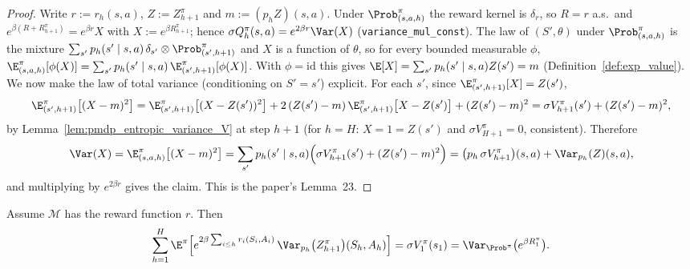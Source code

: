 \begin{proof}
\leanok
Write $r := r_h(s,a)$, $Z := Z^\pi_{h+1}$ and $m := (p_h Z)(s,a)$. Under $\Prob^\pi_{(s,a,h)}$ the
reward kernel is $\delta_{r}$, so $R = r$ a.s.\ and $e^{\beta(R + R^\pi_{h+1})} = e^{\beta r}X$ with
$X := e^{\beta R^\pi_{h+1}}$; hence $\sigma Q^\pi_h(s,a) = e^{2\beta r}\Var(X)$
(\texttt{variance\_mul\_const}). The law of $(S', \theta)$ under $\Prob^\pi_{(s,a,h)}$ is the
mixture $\sum_{s'} p_h(s' \mid s,a)\,\delta_{s'} \otimes \Prob^\pi_{(s',h+1)}$ and $X$ is a
function of $\theta$, so for every bounded measurable $\phi$,
$\E^\pi_{(s,a,h)}[\phi(X)] = \sum_{s'} p_h(s' \mid s,a)\,\E^\pi_{(s',h+1)}[\phi(X)]$. With
$\phi = \mathrm{id}$ this gives $\E[X] = \sum_{s'} p_h(s'\mid s,a) Z(s') = m$
(Definition~\ref{def:exp_value}). We now make the law of total variance (conditioning on
$S' = s'$) explicit. For each $s'$, since $\E^\pi_{(s',h+1)}[X] = Z(s')$,
\[
  \E^\pi_{(s',h+1)}\big[(X - m)^2\big]
  = \E^\pi_{(s',h+1)}\big[(X - Z(s'))^2\big] + 2\,(Z(s') - m)\,\E^\pi_{(s',h+1)}\big[X - Z(s')\big] + (Z(s') - m)^2
  = \sigma V^\pi_{h+1}(s') + (Z(s') - m)^2 ,
\]
by Lemma~\ref{lem:pmdp_entropic_variance_V} at step $h + 1$ (for $h = H$: $X = 1 = Z(s')$ and
$\sigma V^\pi_{H+1} = 0$, consistent). Therefore
\[
  \Var(X) = \E^\pi_{(s,a,h)}\big[(X - m)^2\big]
  = \sum_{s'} p_h(s' \mid s,a)\Big(\sigma V^\pi_{h+1}(s') + (Z(s') - m)^2\Big)
  = \big(p_h\,\sigma V^\pi_{h+1}\big)(s,a) + \Var_{p_h}(Z)(s,a) ,
\]
and multiplying by $e^{2\beta r}$ gives the claim. This is the paper's Lemma~23.
\end{proof}

\begin{lemma}\label{lem:entropic_variance_sum}
\leanok
{}
Assume $\mathcal M$ has the reward function $r$. Then
\[
  \sum_{h=1}^{H}\E^\pi\Big[e^{2\beta\sum_{i \le h} r_i(S_i, A_i)}\,\Var_{p_h}\big(Z^\pi_{h+1}\big)(S_h, A_h)\Big]
  = \sigma V^\pi_1(s_1) = \Var_{\Prob^\pi}\big(e^{\beta R^\pi_1}\big) .
\]
\end{lemma}

